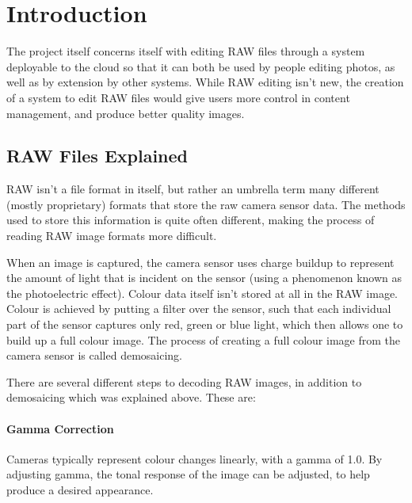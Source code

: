 \documentclass[11pt,a4paper]{article}
\begin{document}
\section{Introduction}

The project itself concerns itself with editing RAW files through a system deployable to the cloud
so that it can both be used by people editing photos, as well as by extension by other systems. While RAW
editing isn't new, the creation of a system to edit RAW files would give users more control in content management,
and produce better quality images.

\subsection{RAW Files Explained}
RAW isn't a file format in itself, but rather an umbrella term many different (mostly proprietary) formats that store the
raw camera sensor data. The methods used to store this information is quite often different, making the process of reading
RAW image formats more difficult.

When an image is captured, the camera sensor uses charge buildup to represent the amount of light that is incident on the sensor
(using a phenomenon known as the photoelectric effect). Colour data itself isn't stored at all in the RAW image. Colour is achieved
by putting a filter over the sensor, such that each individual part of the sensor captures only red, green or blue light, which then
allows one to build up a full colour image. The process of creating a full colour image from the camera sensor is called demosaicing. 
\cite{UnderstandingRAWCapture}

There are several different steps to decoding RAW images, in addition to demosaicing which was explained above. These are:


\paragraph{Gamma Correction}
Cameras typically represent colour changes linearly, with a gamma of 1.0. 
By adjusting gamma, the tonal response of the image can be adjusted, to help produce a desired appearance.
\end{document}
